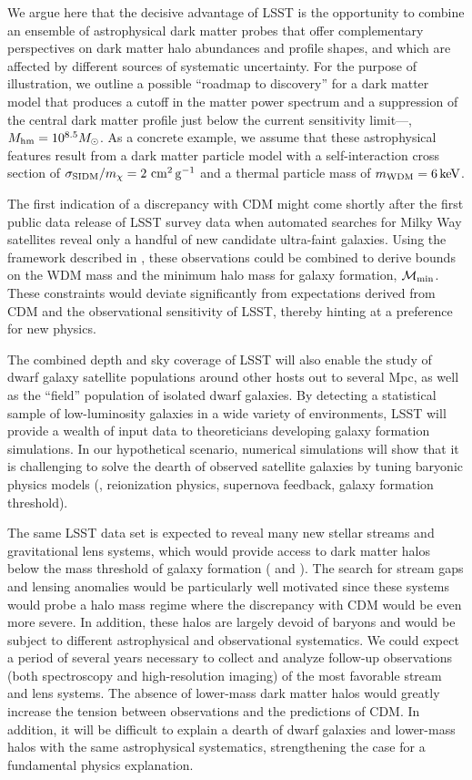 We argue here that the decisive advantage of LSST is the opportunity to combine an ensemble of astrophysical dark matter probes that offer complementary perspectives on dark matter halo abundances and profile shapes, and which are affected by different sources of systematic uncertainty.
For the purpose of illustration, we outline a possible ``roadmap to discovery'' for a dark matter model that produces a cutoff in the matter power spectrum and a suppression of the central dark matter profile just below the current sensitivity limit---\ie, $M_{\rm hm} = 10^{8.5}M_\odot$.
As a concrete example, we assume that these astrophysical features result from a dark matter particle model with a self-interaction cross section of $\sigma_{\rm SIDM}/m_\chi = 2 \mathrm{\,\mathrm{\,cm}^2\mathrm{\,g}^{-1}}$ and a thermal particle mass of $m_{\rm WDM} = 6 \mathrm{\,keV}$.

The first indication of a discrepancy with CDM might come shortly after the first public data release of LSST survey data when automated searches for Milky Way satellites reveal only a handful of new candidate ultra-faint galaxies. 
Using the framework described in , these observations could be combined to derive bounds on the WDM mass and the minimum halo mass for galaxy formation, $\mathcal{M}_{\rm min}$. These constraints would deviate significantly from expectations derived from CDM and the observational sensitivity of LSST, thereby hinting at a preference for new physics.

The combined depth and sky coverage of LSST will also enable the study of dwarf galaxy satellite populations around other hosts out to several Mpc, as well as the ``field'' population of isolated dwarf galaxies.
By detecting a statistical sample of low-luminosity galaxies in a wide variety of environments, LSST will provide a wealth of input data to theoreticians developing galaxy formation simulations.
In our hypothetical scenario, numerical simulations will show that it is challenging to solve the dearth of observed satellite galaxies by tuning baryonic physics models (\eg, reionization physics, supernova feedback, galaxy formation threshold).

The same LSST data set is expected to reveal many new stellar streams and gravitational lens systems, which would provide access to dark matter halos below the mass threshold of galaxy formation ( and ).
The search for stream gaps and lensing anomalies would be particularly well motivated since these systems would probe a halo mass regime where the discrepancy with CDM would be even more severe.
In addition, these halos are largely devoid of baryons and would be subject to different astrophysical and observational systematics.
We could expect a period of several years necessary to collect and analyze follow-up observations (both spectroscopy and high-resolution imaging) of the most favorable stream and lens systems.
The absence of lower-mass dark matter halos would greatly increase the tension between observations and the predictions of CDM.
In addition, it will be difficult to explain a dearth of dwarf galaxies and lower-mass halos with the same astrophysical systematics, strengthening the case for a fundamental physics explanation.

